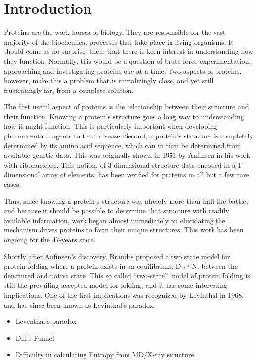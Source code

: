 \section*{Introduction}
\label{sec:introduction}
Proteins are the work-horses of biology. They are responsible for the vast majority of the biochemical processes that take place in living organisms. It should come as no surprise, then, that there is keen interest in understanding how they function. Normally, this would be a question of brute-force experimentation, approaching and investigating proteins one at a time. Two aspects of proteins, however, make this a problem that is tantalizingly close, and yet still frustratingly far, from a complete solution.

The first useful aspect of proteins is the relationship between their structure and their function. Knowing a protein's structure goes a long way to understanding how it might function. This is particularly important when developing pharmaceutical agents to treat disease. Second, a protein's structure is completely determined by its amino acid sequence, which can in turn be determined from available genetic data. This was originally shown in 1961 by Anfinsen \cite{Service:2008p294} in his work with ribonuclease. This notion, of 3-dimensional structure data encoded in a 1-dimensional array of elements, has been verified for proteins in all but a few rare cases.

Thus, since knowing a protein's structure was already more than half the battle, and because it should be possible to determine that structure with readily available information, work began almost immediately on elucidating the mechanism drives proteins to form their unique structures. This work has been ongoing for the 47-years since.

Shortly after Anfinsen's discovery, Brandts proposed a two state model for protein folding where a protein exists in an equilibrium, $\mathbf{\mathrm{D}} \rightleftarrows \mathbf{\mathrm{N}}$, between the denatured and native state\cite{Clark:2008p141}. This so called ``two-state'' model of protein folding is still the prevailing accepted model for folding, and it has some interesting implications. One of the first implications was recognized by Levinthal in 1968, and has since been known as Levinthal's paradox.



\begin{itemize}
	\item Leventhal's paradox
	\item Dill's Funnel
	\item Difficulty in calculating Entropy from MD/X-ray structure
\end{itemize}
